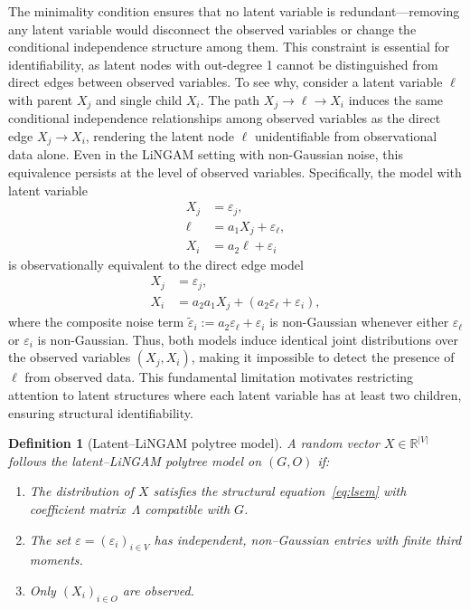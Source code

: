 \documentclass[11pt,a4paper]{article}
\numberwithin{equation}{section}
\newtheorem{definition}[theorem]{Definition}
\begin{document}
The minimality condition ensures that no latent variable is redundant—removing any latent variable would disconnect the observed variables or change the conditional independence structure among them. This constraint is essential for identifiability, as latent nodes with out-degree 1 cannot be distinguished from direct edges between observed variables. To see why, consider a latent variable $\ell$ with parent $X_j$ and single child $X_i$. The path $X_j \to \ell \to X_i$ induces the same conditional independence relationships among observed variables as the direct edge $X_j \to X_i$, rendering the latent node $\ell$ unidentifiable from observational data alone. Even in the LiNGAM setting with non-Gaussian noise, this equivalence persists at the level of observed variables. Specifically, the model with latent variable
\begin{align*}
X_j &= \varepsilon_j, \\
\ell &= a_1 X_j + \varepsilon_\ell, \\
X_i &= a_2 \ell + \varepsilon_i
\end{align*}
is observationally equivalent to the direct edge model
\begin{align*}
X_j &= \varepsilon_j, \\
X_i &= a_2 a_1 X_j + (a_2 \varepsilon_\ell + \varepsilon_i),
\end{align*}
where the composite noise term $\tilde{\varepsilon}_i := a_2 \varepsilon_\ell + \varepsilon_i$ is non-Gaussian whenever either $\varepsilon_\ell$ or $\varepsilon_i$ is non-Gaussian. Thus, both models induce identical joint distributions over the observed variables $(X_j, X_i)$, making it impossible to detect the presence of $\ell$ from observed data. This fundamental limitation motivates restricting attention to latent structures where each latent variable has at least two children, ensuring structural identifiability\citep[cf.][]{etesami:kiyavash:coleman:2016}.

\begin{definition}[Latent--LiNGAM polytree model]\label{def:latent_lingam_model}
A random vector $X\in\mathbb R^{|V|}$ follows the latent--LiNGAM polytree model on $(G,O)$ if:
\begin{enumerate}[label=(\roman*)]
  \item The distribution of $X$ satisfies the structural equation~\eqref{eq:lsem} with coefficient matrix~$\Lambda$ compatible with $G$.
  \item The set $\varepsilon=(\varepsilon_i)_{i\in V}$ has independent, non--Gaussian entries with finite third moments.
  \item Only $(X_i)_{i\in O}$ are observed.
\end{enumerate}
\end{definition}
\end{document}

